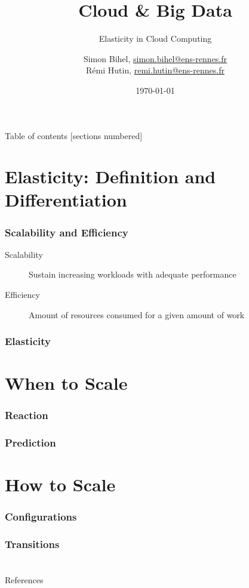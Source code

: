 \documentclass{beamer}
\title{Cloud \& Big Data}
\subtitle{Elasticity in Cloud Computing}
\date{\today}
\author{%
  Simon Bihel, \url{simon.bihel@ens-rennes.fr} \\
  Rémi Hutin, \url{remi.hutin@ens-rennes.fr}
}
\institute{%
  University of Rennes I \\
  École normale supérieure de Rennes
}
\begin{document}
\maketitle

\begin{frame}{Table of contents}
  [sections numbered]
  \tableofcontents[hideallsubsections]
\end{frame}


\section{Elasticity: Definition and Differentiation}
\begin{frame}
  \frametitle{Scalability and Efficiency \cite{herbst2013elasticity}}
  \begin{description}
    \item[Scalability] Sustain increasing workloads with adequate performance
    \item[Efficiency] Amount of resources consumed for a given amount of work
  \end{description}
\end{frame}

\begin{frame}
  \frametitle{Elasticity \cite{herbst2013elasticity}}
\end{frame}


\section{When to Scale}
\begin{frame}
  \frametitle{Reaction}
\end{frame}

\begin{frame}
  \frametitle{Prediction}
\end{frame}


\section{How to Scale}
\begin{frame}
  \frametitle{Configurations}
\end{frame}

\begin{frame}
  \frametitle{Transitions}
\end{frame}


\section*{}
\begin{frame}[allowframebreaks]{References}
  
  
\end{frame}
\end{document}
